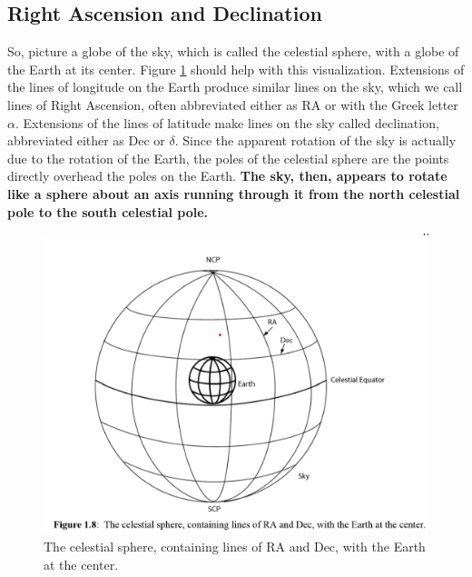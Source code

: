 \documentclass[10pt]{report}
\begin{document}
\subsection{Right Ascension and Declination}
So, picture a globe of the sky, which is called the celestial sphere, with a globe of the Earth at its center.  Figure \ref{radec} should help with this visualization.  Extensions of the lines of longitude on the Earth produce similar lines on the sky, which we call lines of Right Ascension, often abbreviated either as RA or with the Greek letter $\alpha$.  Extensions of the lines of latitude make lines on the sky called declination, abbreviated either as Dec or $\delta$.  Since the apparent rotation of the sky is actually due to the rotation of the Earth, the poles of the celestial sphere are the points directly overhead the poles on the Earth.  \textbf{The sky, then, appears to rotate like a sphere about an axis running through it from the north celestial pole to the south celestial pole. }

\begin{figure}\label{radec}
\includegraphics[width=\linewidth]{radec.png}
\caption{ The celestial sphere, containing lines of RA and Dec, with the Earth at the center. }
\end{figure}
\end{document}
